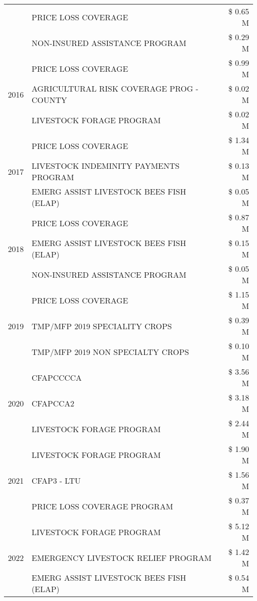 \begin{tabular}{llr}
 & PRICE LOSS COVERAGE & \$ 0.65 M \\
 & NON-INSURED ASSISTANCE PROGRAM & \$ 0.29 M \\
\cline{1-3}
\multirow[t]{3}{*}{2016} & PRICE LOSS COVERAGE & \$ 0.99 M \\
 & AGRICULTURAL RISK COVERAGE PROG - COUNTY & \$ 0.02 M \\
 & LIVESTOCK FORAGE PROGRAM & \$ 0.02 M \\
\cline{1-3}
\multirow[t]{3}{*}{2017} & PRICE LOSS COVERAGE & \$ 1.34 M \\
 & LIVESTOCK INDEMINITY PAYMENTS PROGRAM & \$ 0.13 M \\
 & EMERG ASSIST LIVESTOCK BEES FISH (ELAP) & \$ 0.05 M \\
\cline{1-3}
\multirow[t]{3}{*}{2018} & PRICE LOSS COVERAGE & \$ 0.87 M \\
 & EMERG ASSIST LIVESTOCK BEES FISH (ELAP) & \$ 0.15 M \\
 & NON-INSURED ASSISTANCE PROGRAM & \$ 0.05 M \\
\cline{1-3}
\multirow[t]{3}{*}{2019} & PRICE LOSS COVERAGE & \$ 1.15 M \\
 & TMP/MFP 2019 SPECIALITY CROPS & \$ 0.39 M \\
 & TMP/MFP 2019 NON SPECIALTY CROPS & \$ 0.10 M \\
\cline{1-3}
\multirow[t]{3}{*}{2020} & CFAPCCCCA & \$ 3.56 M \\
 & CFAPCCA2 & \$ 3.18 M \\
 & LIVESTOCK FORAGE PROGRAM & \$ 2.44 M \\
\cline{1-3}
\multirow[t]{3}{*}{2021} & LIVESTOCK FORAGE PROGRAM & \$ 1.90 M \\
 & CFAP3 - LTU & \$ 1.56 M \\
 & PRICE LOSS COVERAGE PROGRAM & \$ 0.37 M \\
\cline{1-3}
\multirow[t]{3}{*}{2022} & LIVESTOCK FORAGE PROGRAM & \$ 5.12 M \\
 & EMERGENCY LIVESTOCK RELIEF PROGRAM & \$ 1.42 M \\
 & EMERG ASSIST LIVESTOCK BEES FISH (ELAP) & \$ 0.54 M \\
\cline{1-3}
\bottomrule
\end{tabular}
